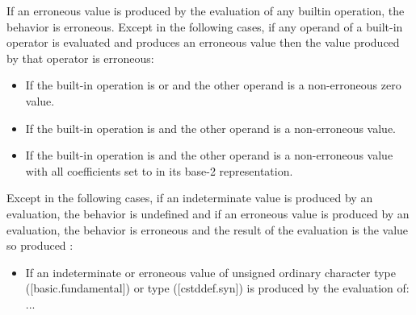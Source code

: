 \begin{adjustwidth}{0.5cm}{0.5cm}
\begin{addedblock}
If an erroneous value is produced by the evaluation of any builtin operation, the behavior is erroneous. Except in the following cases, if any operand of a built-in operator is evaluated and produces an erroneous value then the value
produced by that operator is erroneous:
\begin{itemize}
\item  If the built-in operation is \tcode{*} or \tcode{\&} and the other operand is a non-erroneous zero value.
\item  If the built-in operation is \tcode{\%} and the other operand is a non-erroneous  value.
\item  If the built-in operation is \tcode{|} and the other operand is a non-erroneous value with all coefficients set to  in its base-2 representation.
\end{itemize}
\end{addedblock}

Except in the following cases, if an indeterminate value is produced by an evaluation,
the behavior is undefined  and if an erroneous value is produced by an evaluation, the behavior is erroneous and
the result of the evaluation is the value so produced 
:
\begin{itemize}
\item If an indeterminate or erroneous value of unsigned ordinary character type ([basic.\allowbreak{}fundamental]) or  type ([cstddef.syn]) is produced by the evaluation of:  \\ ...
\end{itemize}
\end{adjustwidth}




\pagebreak
\renewcommand{\bibname}{References}  %






